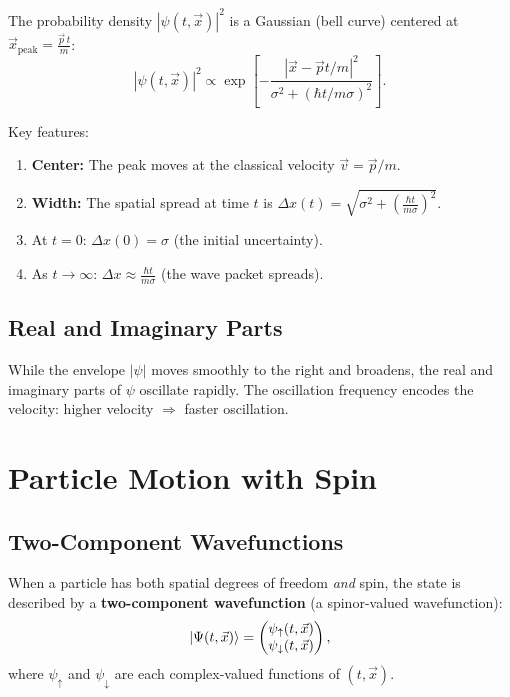 \documentclass[11pt,a4paper]{article}
\theoremstyle{definition}
\theoremstyle{plain}
\theoremstyle{remark}
\begin{document}
The probability density $|\psi(t, \vec{x})|^2$ is a Gaussian (bell curve) centered at $\vec{x}_{\text{peak}} = \frac{\vec{p}\,t}{m}$:
\[
    |\psi(t, \vec{x})|^2 \propto \exp\!\left[-\frac{|\vec{x} - \vec{p}t/m|^2}{\sigma^2 + (\hbar t / m\sigma)^2}\right].
\]

Key features:
\begin{enumerate}
    \item \textbf{Center:} The peak moves at the classical velocity $\vec{v} = \vec{p}/m$.
    \item \textbf{Width:} The spatial spread at time $t$ is $\Delta x(t) = \sqrt{\sigma^2 + \left(\frac{\hbar t}{m\sigma}\right)^2}$.
    \item At $t = 0$: $\Delta x(0) = \sigma$ (the initial uncertainty).
    \item As $t \to \infty$: $\Delta x \approx \frac{\hbar t}{m\sigma}$ (the wave packet spreads).
\end{enumerate}

\subsection{Real and Imaginary Parts}

While the envelope $|\psi|$ moves smoothly to the right and broadens, the real and imaginary parts of $\psi$ oscillate rapidly. The oscillation frequency encodes the velocity: higher velocity $\Rightarrow$ faster oscillation.

\section{Particle Motion with Spin}

\subsection{Two-Component Wavefunctions}

When a particle has both spatial degrees of freedom \emph{and} spin, the state is described by a \textbf{two-component wavefunction} (a spinor-valued wavefunction):
\[
    \ket{\Psi(t, \vec{x})} = \begin{pmatrix} \psi_\uparrow(t, \vec{x}) \\ \psi_\downarrow(t, \vec{x}) \end{pmatrix},
\]
where $\psi_\uparrow$ and $\psi_\downarrow$ are each complex-valued functions of $(t, \vec{x})$.
\end{document}
